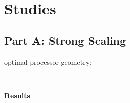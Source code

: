 \documentclass{article}
\begin{document}
\newpage

\section{Studies}
\subsection{Part A: Strong Scaling}
\begin{description}
    \item[optimal processor geometry: ] \hfill \\ 
    
\end{description}

\textbf{Results}
\end{document}
